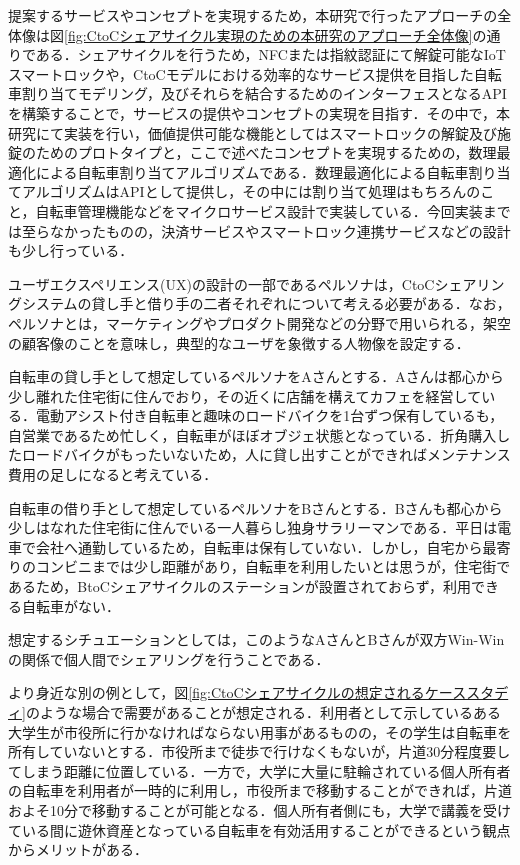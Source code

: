       \par 提案するサービスやコンセプトを実現するため，本研究で行ったアプローチの全体像は図\ref{fig:CtoCシェアサイクル実現のための本研究のアプローチ全体像}の通りである．シェアサイクルを行うため，NFCまたは指紋認証にて解錠可能なIoTスマートロックや，CtoCモデルにおける効率的なサービス提供を目指した自転車割り当てモデリング，及びそれらを結合するためのインターフェスとなるAPIを構築することで，サービスの提供やコンセプトの実現を目指す．その中で，本研究にて実装を行い，価値提供可能な機能としてはスマートロックの解錠及び施錠のためのプロトタイプと，ここで述べたコンセプトを実現するための，数理最適化による自転車割り当てアルゴリズムである．数理最適化による自転車割り当てアルゴリズムはAPIとして提供し，その中には割り当て処理はもちろんのこと，自転車管理機能などをマイクロサービス設計で実装している．今回実装までは至らなかったものの，決済サービスやスマートロック連携サービスなどの設計も少し行っている．
      \par ユーザエクスペリエンス(UX)の設計の一部であるペルソナは，CtoCシェアリングシステムの貸し手と借り手の二者それぞれについて考える必要がある．なお，ペルソナとは，マーケティングやプロダクト開発などの分野で用いられる，架空の顧客像のことを意味し，典型的なユーザを象徴する人物像を設定する．
      \par 自転車の貸し手として想定しているペルソナをAさんとする．Aさんは都心から少し離れた住宅街に住んでおり，その近くに店舗を構えてカフェを経営している．電動アシスト付き自転車と趣味のロードバイクを1台ずつ保有しているも，自営業であるため忙しく，自転車がほぼオブジェ状態となっている．折角購入したロードバイクがもったいないため，人に貸し出すことができればメンテナンス費用の足しになると考えている．
      \par 自転車の借り手として想定しているペルソナをBさんとする．Bさんも都心から少しはなれた住宅街に住んでいる一人暮らし独身サラリーマンである．平日は電車で会社へ通勤しているため，自転車は保有していない．しかし，自宅から最寄りのコンビニまでは少し距離があり，自転車を利用したいとは思うが，住宅街であるため，BtoCシェアサイクルのステーションが設置されておらず，利用できる自転車がない．
      \par 想定するシチュエーションとしては，このようなAさんとBさんが双方Win-Winの関係で個人間でシェアリングを行うことである．
      \par より身近な別の例として，図\ref{fig:CtoCシェアサイクルの想定されるケーススタディ}のような場合で需要があることが想定される．利用者として示しているある大学生が市役所に行かなければならない用事があるものの，その学生は自転車を所有していないとする．市役所まで徒歩で行けなくもないが，片道30分程度要してしまう距離に位置している．一方で，大学に大量に駐輪されている個人所有者の自転車を利用者が一時的に利用し，市役所まで移動することができれば，片道およそ10分で移動することが可能となる．個人所有者側にも，大学で講義を受けている間に遊休資産となっている自転車を有効活用することができるという観点からメリットがある．
      
